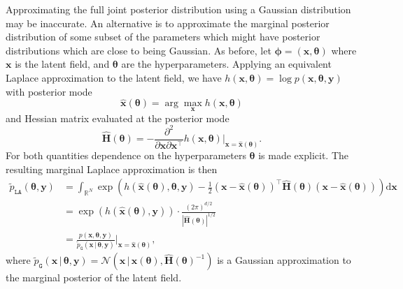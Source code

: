 \documentclass[a4paper, nobind]{templates/ociamthesis}
\begin{document}
Approximating the full joint posterior distribution using a Gaussian distribution may be inaccurate.
An alternative is to approximate the marginal posterior distribution of some subset of the parameters which might have posterior distributions which are close to being Gaussian.
As before, let \(\boldsymbol{\mathbf{\phi}} = (\mathbf{x}, \boldsymbol{\mathbf{\theta}})\) where \(\mathbf{x}\) is the latent field, and \(\boldsymbol{\mathbf{\theta}}\) are the hyperparameters.
Applying an equivalent Laplace approximation to the latent field, we have \(h(\mathbf{x}, \boldsymbol{\mathbf{\theta}}) = \log p(\mathbf{x}, \boldsymbol{\mathbf{\theta}}, \mathbf{y})\) with posterior mode
\begin{equation}
\hat{\mathbf{x}}(\boldsymbol{\mathbf{\theta}}) = \arg\max_{\mathbf{x}} h(\mathbf{x}, \boldsymbol{\mathbf{\theta}})
\end{equation}
and Hessian matrix evaluated at the posterior mode
\begin{equation}
\hat {\mathbf{H}}(\boldsymbol{\mathbf{\theta}}) = - \frac{\partial^2}{\partial \mathbf{x} \partial \mathbf{x}^\top} h(\mathbf{x}, \boldsymbol{\mathbf{\theta}}) \rvert_{\mathbf{x} = \hat{\mathbf{x}}(\boldsymbol{\mathbf{\theta}})}.
\end{equation}
For both quantities dependence on the hyperparameters \(\boldsymbol{\mathbf{\theta}}\) is made explicit.
The resulting marginal Laplace approximation is then
\begin{align}
\tilde p_{\texttt{LA}}(\boldsymbol{\mathbf{\theta}}, \mathbf{y}) &= \int_{\mathbb{R}^N} \exp \left( h(\hat{\mathbf{x}}(\boldsymbol{\mathbf{\theta}}), \boldsymbol{\mathbf{\theta}}, \mathbf{y}) - \frac{1}{2} (\mathbf{x} - \hat{\mathbf{x}}(\boldsymbol{\mathbf{\theta}}))^\top \hat {\mathbf{H}}(\boldsymbol{\mathbf{\theta}}) (\mathbf{x} - \hat{\mathbf{x}}(\boldsymbol{\mathbf{\theta}})) \right) \text{d}\mathbf{x} \label{eq:marginalla} \\
&= \exp(h(\hat{\mathbf{x}}(\boldsymbol{\mathbf{\theta}}), \mathbf{y})) \cdot \frac{(2 \pi)^{d/2}}{| \hat {\mathbf{H}}(\boldsymbol{\mathbf{\theta}}) |^{1/2}} \\
&= \frac{p(\mathbf{x}, \boldsymbol{\mathbf{\theta}}, \mathbf{y})}{\tilde p_\texttt{G}(\mathbf{x} \, | \, \boldsymbol{\mathbf{\theta}}, \mathbf{y})} \Big\rvert_{\mathbf{x} = \hat{\mathbf{x}}(\boldsymbol{\mathbf{\theta}})},
\end{align}
where \(\tilde p_\texttt{G}(\mathbf{x} \, | \, \boldsymbol{\mathbf{\theta}}, \mathbf{y}) = \mathcal{N}(\mathbf{x} \, | \, \hat{\mathbf{x}}(\boldsymbol{\mathbf{\theta}}), \hat{\mathbf{H}}(\boldsymbol{\mathbf{\theta}})^{-1})\) is a Gaussian approximation to the marginal posterior of the latent field.
\end{document}
